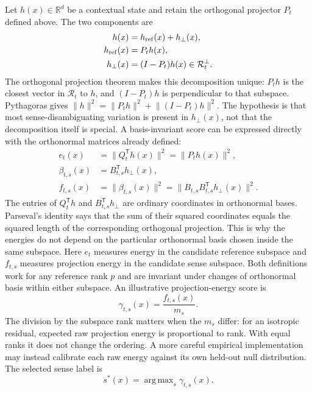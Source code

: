 \documentclass[
  aps,
  reprint,
  superscriptaddress,
  floatfix,
  nofootinbib,
  longbibliography
]{revtex4-2}
\newcommand{\R}{\mathbb{R}}
\newcommand{\T}{^{\mathsf{T}}}
\newcommand{\norm}[1]{\lVert #1 \rVert}
\DeclareMathOperator*{\argmax}{arg\,max}
\begin{document}
Let $h(x)\in\R^d$ be a contextual state and retain the orthogonal projector
$P_t$ defined above. The two components are
%
\begin{align}
\label{eq:reference-decomp}
h(x)&=h_{\rm ref}(x)+h_\perp(x),\\
h_{\rm ref}(x)&=P_t h(x),\nonumber\\
h_\perp(x)&=(I-P_t)h(x)\in\mathcal R_t^\perp.\nonumber
\end{align}
%
The orthogonal projection theorem makes this decomposition unique:
$P_th$ is the closest vector in $\mathcal R_t$ to $h$, and $(I-P_t)h$ is
perpendicular to that subspace.  Pythagoras gives
$\norm h^2=\norm{P_th}^2+\norm{(I-P_t)h}^2$.
The hypothesis is that most sense-disambiguating variation is present in
$h_\perp(x)$, not that the decomposition itself is special.  A
basis-invariant score can be expressed directly with the orthonormal matrices
already defined:
%
\begin{align}
\label{eq:sense-coordinates}
e_t(x)&=\norm{Q_t\T h(x)}^2=\norm{P_t h(x)}^2,\nonumber\\
\beta_{t,s}(x)&=B_{t,s}\T h_\perp(x),\\
f_{t,s}(x)&=\norm{\beta_{t,s}(x)}^2
=\norm{B_{t,s}B_{t,s}\T h_\perp(x)}^2.\nonumber
\end{align}
%
The entries of $Q_t\T h$ and $B_{t,s}\T h_\perp$ are ordinary coordinates in
orthonormal bases.  Parseval's identity says that the sum of their squared
coordinates equals the squared length of the corresponding orthogonal
projection.  This is why the energies do not depend on the particular
orthonormal basis chosen inside the same subspace.
Here $e_t$ measures energy in the candidate reference subspace and $f_{t,s}$
measures projection energy in the candidate sense subspace.  Both definitions
work for any reference rank $p$ and are invariant under changes of orthonormal
basis within either subspace.  An illustrative projection-energy score is
%
\begin{equation}
\label{eq:sense-score}
\gamma_{t,s}(x)=\frac{f_{t,s}(x)}{m_s}.
\end{equation}
%
The division by the subspace rank matters when the $m_s$ differ: for an
isotropic residual, expected raw projection energy is proportional to rank.
With equal ranks it does not change the ordering.  A more careful empirical
implementation may instead calibrate each raw energy against its own held-out
null distribution.
The selected sense label is
%
\begin{equation}
\label{eq:selected-sense}
s^*(x)=\argmax_s \gamma_{t,s}(x).
\end{equation}
\end{document}
